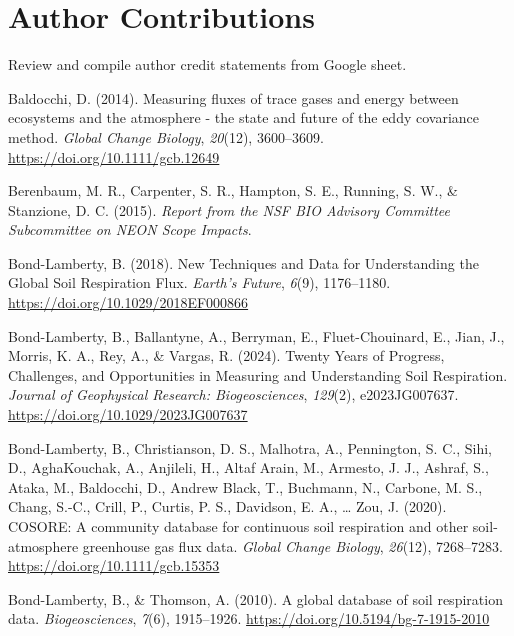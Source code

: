 \documentclass[
  letterpaper,
  DIV=11,
  numbers=noendperiod]{scrartcl}
\newlength{\cslhangindent}
\newenvironment{CSLReferences}[2] %
 {\begin{list}{}{%
  \setlength{\itemindent}{0pt}
  \setlength{\leftmargin}{0pt}
  \setlength{\parsep}{0pt}
  \ifodd #1
   \setlength{\leftmargin}{\cslhangindent}
   \setlength{\itemindent}{-1\cslhangindent}
  \fi
  \setlength{\itemsep}{#2\baselineskip}}}
 {\end{list}}
\begin{document}
\section{Author Contributions}\label{author-contributions}

Review and compile author credit statements from Google sheet.

\label{refs}
\begin{CSLReferences}{1}{0}
Baldocchi, D. (2014). Measuring fluxes of trace gases and energy between
ecosystems and the atmosphere - the state and future of the eddy
covariance method. \emph{Global Change Biology}, \emph{20}(12),
3600--3609. \url{https://doi.org/10.1111/gcb.12649}

Berenbaum, M. R., Carpenter, S. R., Hampton, S. E., Running, S. W., \&
Stanzione, D. C. (2015). \emph{Report from the {NSF BIO Advisory
Committee Subcommittee} on {NEON Scope Impacts}}.

Bond-Lamberty, B. (2018). New {Techniques} and {Data} for
{Understanding} the {Global Soil Respiration Flux}. \emph{Earth's
Future}, \emph{6}(9), 1176--1180.
\url{https://doi.org/10.1029/2018EF000866}

Bond-Lamberty, B., Ballantyne, A., Berryman, E., Fluet-Chouinard, E.,
Jian, J., Morris, K. A., Rey, A., \& Vargas, R. (2024). Twenty {Years}
of {Progress}, {Challenges}, and {Opportunities} in {Measuring} and
{Understanding Soil Respiration}. \emph{Journal of Geophysical Research:
Biogeosciences}, \emph{129}(2), e2023JG007637.
\url{https://doi.org/10.1029/2023JG007637}

Bond-Lamberty, B., Christianson, D. S., Malhotra, A., Pennington, S. C.,
Sihi, D., AghaKouchak, A., Anjileli, H., Altaf Arain, M., Armesto, J.
J., Ashraf, S., Ataka, M., Baldocchi, D., Andrew Black, T., Buchmann,
N., Carbone, M. S., Chang, S.-C., Crill, P., Curtis, P. S., Davidson, E.
A., \ldots{} Zou, J. (2020). {COSORE}: {A} community database for
continuous soil respiration and other soil-atmosphere greenhouse gas
flux data. \emph{Global Change Biology}, \emph{26}(12), 7268--7283.
\url{https://doi.org/10.1111/gcb.15353}

Bond-Lamberty, B., \& Thomson, A. (2010). A global database of soil
respiration data. \emph{Biogeosciences}, \emph{7}(6), 1915--1926.
\url{https://doi.org/10.5194/bg-7-1915-2010}


\end{CSLReferences}
\end{document}
